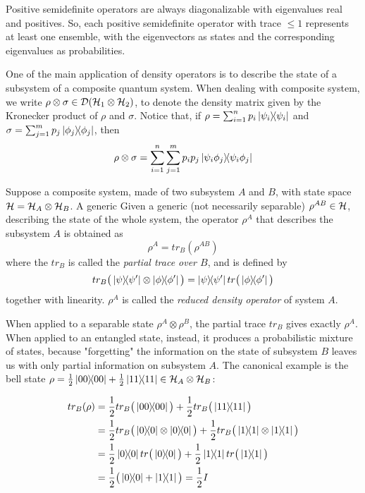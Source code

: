 Positive semidefinite operators are always diagonalizable with eigenvalues real and positives. So, each positive semidefinite operator with trace $\leq 1$ represents at least one ensemble, with the eigenvectors as states and the corresponding eigenvalues as probabilities.

One of the main application of density operators is to describe the state of a subsystem of a composite quantum system. When dealing with composite system, we write $\rho \otimes \sigma \in \mathcal{D}(\mathcal{H}_1 \otimes \mathcal{H}_2)$, to denote the density matrix given by the Kronecker product of $\rho$ and $\sigma$. Notice that, if $\rho = \sum_{i=1}^n p_i\ket{\psi_i}\!\!\bra{\psi_i}$ and $\sigma = \sum_{j=1}^m p_j\ket{\phi_j}\!\!\bra{\phi_j}$, then 
\[\rho \otimes \sigma = \sum_{i=1}^n\sum_{j=1}^m p_ip_j \ket{\psi_i\phi_j}\!\!\bra{\psi_i\phi_j}\]

Suppose a composite system, made of two subsystem $A$ and $B$, with state space  $\mathcal{H} = \mathcal{H}_A \otimes \mathcal{H}_B$. A generic  Given a generic (not necessarily separable) $\rho^{AB} \in \mathcal{H}$, describing the state of the whole system, the operator $\rho^A$ that describes the subsystem $A$ is obtained as 
\[
	\rho^A = tr_B(\rho^{AB})
\]
where the $tr_B$ is called the \textit{partial trace over $B$}, and is defined by 
\[
 tr_B\big(\ketbra{\psi}{\psi'} \otimes \ketbra{\phi}{\phi'}\big) = \ketbra{\psi}{\psi'}tr\big(\ketbra{\phi}{\phi'}\big)
\]
together with linearity. $\rho^A$ is called the \textit{reduced density operator} of system $A$.

When applied to a separable state $\rho^A \otimes \rho^B$, the partial trace $tr_B$ gives exactly $\rho^A$. When applied to an entangled state, instead, it produces a probabilistic mixture of states, because "forgetting" the information on the state of subsystem $B$ leaves us with only partial information on subsystem $A$. The canonical example is the bell state $\rho = \frac{1}{2} \ket{00}\!\!\bra{00} + \frac{1}{2}\ket{11}\!\!\bra{11} \in \mathcal{H}_A \otimes \mathcal{H}_B$: 

\begin{align*}
tr_B(\rho) &= \frac{1}{2} tr_B\big(\proj{00}\big) + \frac{1}{2}tr_B\big(\proj{11}\big)  \\
	&= \frac{1}{2} tr_B\big(\proj{0}\otimes\proj{0}\big) + \frac{1}{2}tr_B\big(\proj{1}\otimes\proj{1}\big) \\
	&= \frac{1}{2} \proj{0}tr\big(\proj{0}\big) + \frac{1}{2}\proj{1}tr\big(\proj{1}\big) \\
	&= \frac{1}{2} \big(\proj{0} + \proj{1}\big) = \frac{1}{2}I
\end{align*}


